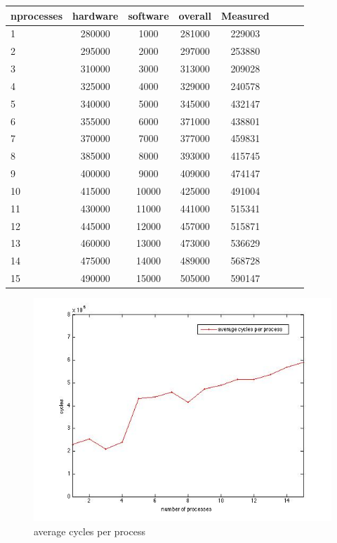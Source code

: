 \begin{center}
\begin{tabular}{l*{6}{c}r}
nprocesses             &  hardware & software & overall & Measured\\
\hline
1 & 280000 & 1000 & 281000 & 229003 \\
2 & 295000 & 2000 & 297000 & 253880 \\
3 & 310000 & 3000 & 313000 & 209028 \\
4 & 325000 & 4000 & 329000 & 240578 \\
5 & 340000 & 5000 & 345000 & 432147 \\
6 & 355000 & 6000 & 371000 & 438801 \\
7 & 370000 &7000 & 377000 & 459831 \\
8 & 385000 & 8000 & 393000 & 415745 \\
9 & 400000 & 9000 & 409000 & 474147 \\
10 & 415000 & 10000 & 425000 & 491004\\
11 & 430000 & 11000 & 441000 & 515341 \\
12 & 445000 & 12000 & 457000 & 515871 \\
13 & 460000 & 13000 & 473000 & 536629\\
14 & 475000 & 14000 & 489000 & 568728\\
15 & 490000 & 15000 & 505000 & 590147\\

\end{tabular}
\end{center}

\begin{figure}[htbp] %
   \centering
   \includegraphics[width=4.5in]{./pics/44.jpg} 
   \caption{average cycles per process}
   \label{fig:average cycles per process}
\end{figure}

